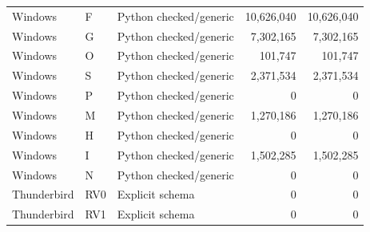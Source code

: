 \begin{longtable}{lllrr}
Windows & F & Python checked/generic & 10,626,040 & 10,626,040 \\
Windows & G & Python checked/generic & 7,302,165 & 7,302,165 \\
Windows & O & Python checked/generic & 101,747 & 101,747 \\
Windows & S & Python checked/generic & 2,371,534 & 2,371,534 \\
Windows & P & Python checked/generic & 0 & 0 \\
Windows & M & Python checked/generic & 1,270,186 & 1,270,186 \\
Windows & H & Python checked/generic & 0 & 0 \\
Windows & I & Python checked/generic & 1,502,285 & 1,502,285 \\
Windows & N & Python checked/generic & 0 & 0 \\
Thunderbird & RV0 & Explicit schema & 0 & 0 \\
Thunderbird & RV1 & Explicit schema & 0 & 0 \\
\bottomrule\end{longtable}
